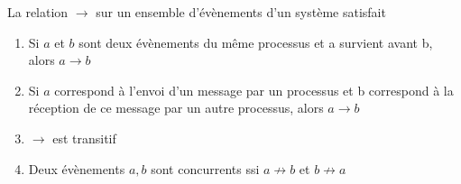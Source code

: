 \documentclass[compress]{beamer}
\begin{document}
\begin{frame}
\begin{definition}
La relation $\rightarrow$ sur un ensemble d'évènements d'un système satisfait
\begin{enumerate}
\item Si $a$ et $b$ sont deux évènements du même processus et a survient avant b, alors $a \rightarrow b$
\item Si $a$ correspond à l'envoi d'un message par un processus et b correspond à la réception de ce message par un autre processus, alors $a \rightarrow b$
\item $\rightarrow$ est transitif
\item Deux évènements $a, b$ sont concurrents ssi $a \not\rightarrow b$ et $b \not\rightarrow a$
\end{enumerate}
\end{definition}
\end{frame}
\end{document}
